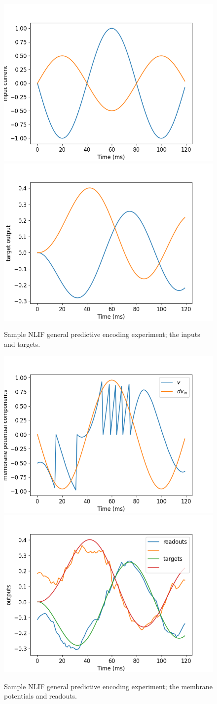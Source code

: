 \documentclass[mphil,deptreport,ianc]{infthesis} %
\begin{document}
\begin{figure}[!h]
    \centering
    \includegraphics[width=0.49\columnwidth]{figures/Supplementary/gating/NLIF/General/01-04_16-42-32-911/test_plot_inputs_NLIF_23.png}
    \includegraphics[width=0.49\columnwidth]{figures/Supplementary/gating/NLIF/General/01-04_16-42-32-911/test_plot_itargets_NLIF_23.png}
    \caption{Sample NLIF general predictive encoding experiment; the inputs and targets.}
    \label{fig:NLIF_GPE_1_inputs_targets}
\end{figure}

\begin{figure}[!h]
    \centering
    \includegraphics[width=0.49\columnwidth]{figures/Supplementary/gating/NLIF/General/01-04_16-42-32-911/test_plot_mem_voltage_single_neuron_NLIF_seed__23.png}
    \includegraphics[width=0.49\columnwidth]{figures/Supplementary/gating/NLIF/General/01-04_16-42-32-911/test_plot_outputs_NLIF_seed_23.png}
    \caption{Sample NLIF general predictive encoding experiment; the membrane potentials and readouts.}
    \label{fig:NLIF_GPE_1_inputs_targets}
\end{figure}
\end{document}
